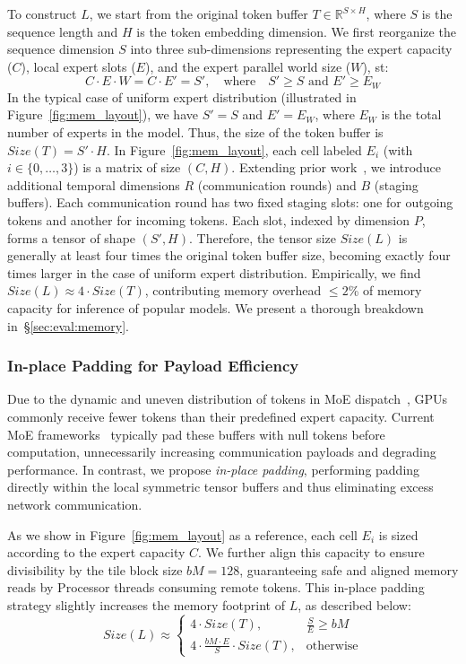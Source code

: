 To construct $L$, we start from the original token buffer $T \in \mathbb{R}^{S \times H}$, where $S$ is the
sequence length and $H$ is the token embedding dimension.
We first reorganize the sequence dimension $S$ into three sub-dimensions representing the expert capacity ($C$),
local expert slots ($E$), and the expert parallel world size ($W$), st:
\[
C \cdot E \cdot W = C \cdot E' = S', \quad\text{where}\quad S' \geq S \text{ and } E' \geq E_W
\]
In the typical case of uniform expert distribution (illustrated in Figure~\ref{fig:mem_layout}),
we have $S' = S$ and $E' = E_W$, where $E_W$ is the total number of experts in the model.
Thus, the size of the token buffer is $Size(T) = S' \cdot H$.
In Figure~\ref{fig:mem_layout}, each cell labeled $E_i$ (with $i \in \{0,\ldots,3\}$) is a matrix of size $(C, H)$.
Extending prior work~\cite{DBLP:conf/iclr/LepikhinLXCFHKS21, comet}, we introduce additional temporal dimensions
$R$ (communication rounds) and $B$ (staging buffers).
Each communication round has two fixed staging slots: one for outgoing tokens and another for incoming tokens.
Each slot, indexed by dimension $P$, forms a tensor of shape $(S', H)$.
Therefore, the tensor size $Size(L)$ is generally at least four times the original token buffer size,
becoming exactly four times larger in the case of uniform expert distribution.
Empirically, we find $Size(L) \approx 4 \cdot Size(T)$, contributing memory overhead $\leq 2$\% of memory capacity for
inference of popular models.
We present a thorough breakdown in~\S\ref{sec:eval:memory}.

\subsubsection{In-place Padding for Payload Efficiency}\label{subsubsec:payload}
Due to the dynamic and uneven distribution of tokens in MoE dispatch~\cite{bmamba}, GPUs commonly
receive fewer tokens than their predefined expert capacity.
Current MoE frameworks~\cite{pmlr-v162-rajbhandari22a} typically pad these buffers with null tokens before computation,
unnecessarily increasing communication payloads and degrading performance.
In contrast, we propose \emph{in-place padding}, performing padding directly within the local
symmetric tensor buffers and thus eliminating excess network communication.

As we show in Figure~\ref{fig:mem_layout} as a reference, each cell $E_i$ is sized according to the expert capacity $C$.
We further align this capacity to ensure divisibility by the tile block size $bM = 128$,
guaranteeing safe and aligned memory reads by Processor threads consuming remote tokens.
This in-place padding strategy slightly increases the memory footprint of $L$, as described below:
\[
    Size(L) \approx \begin{cases}
        4 \cdot Size(T), & \frac{S}{E} \geq bM \\[1ex]
        4 \cdot \frac{bM \cdot E}{S} \cdot Size(T), & \text{otherwise}
    \end{cases}
\]
